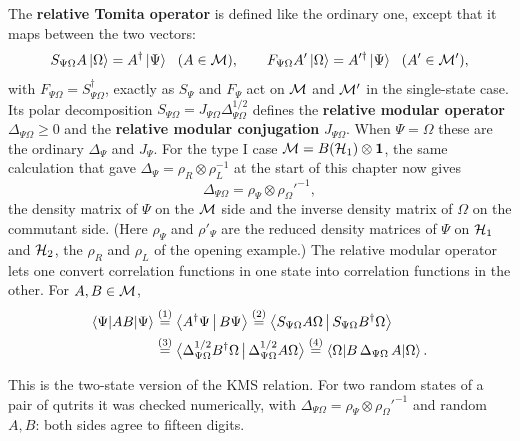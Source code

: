 The \textbf{relative Tomita operator} is defined like the ordinary one, except that it maps between the two
vectors:
\[
S_{\Psi\Omega}A\ket\Omega = A^\dagger\ket\Psi\ \ (A\in\M), \qquad
F_{\Psi\Omega}A'\ket\Omega = A'^\dagger\ket\Psi\ \ (A'\in\M') ,
\]
with $F_{\Psi\Omega}=S_{\Psi\Omega}^\dagger$, exactly as $S_\Psi$ and $F_\Psi$ act on $\mathcal{M}$ and $\mathcal{M}'$ in the
single-state case.
Its polar decomposition $S_{\Psi\Omega}=J_{\Psi\Omega}\Delta_{\Psi\Omega}^{1/2}$ defines the
\textbf{relative modular operator} $\Delta_{\Psi\Omega}\ge0$ and the \textbf{relative modular conjugation}
$J_{\Psi\Omega}$. When $\Psi=\Omega$ these are the ordinary $\Delta_\Psi$ and $J_\Psi$. For the type I case
$\mathcal{M}=B(\mathcal{H}_1)\otimes\mathbf{1}$, the same calculation that gave $\Delta_\Psi=\rho_R\otimes\rho_L^{-1}$ at the start of
this chapter now gives
\[
\Delta_{\Psi\Omega}=\rho_\Psi\otimes\rho_\Omega'^{-1} ,
\]
the density matrix of $\Psi$ on the $\mathcal{M}$ side and the inverse density matrix of $\Omega$ on the commutant
side. (Here $\rho_\Psi$ and $\rho'_\Psi$ are the reduced density matrices of $\Psi$ on $\mathcal{H}_1$ and $\mathcal{H}_2$,
the $\rho_R$ and $\rho_L$ of the opening example.) The relative modular operator lets one convert correlation functions in one state into correlation
functions in the other. For $A,B\in\mathcal{M}$,
\begin{align}
\braket{\Psi|AB|\Psi}
&\overset{(1)}{=} \big\langle A^\dagger\Psi\,\big|\,B\Psi\big\rangle
\overset{(2)}{=} \big\langle S_{\Psi\Omega}A\Omega\,\big|\,S_{\Psi\Omega}B^\dagger\Omega\big\rangle \notag\\
&\overset{(3)}{=} \big\langle \Delta_{\Psi\Omega}^{1/2}B^\dagger\Omega\,\big|\,\Delta_{\Psi\Omega}^{1/2}A\Omega\big\rangle
\overset{(4)}{=} \braket{\Omega|B\,\Delta_{\Psi\Omega}\,A|\Omega} .
\label{eq:twostate-kms}
\end{align}
\quad
{}\quad
{}\quad
{}

This is the two-state version of the KMS relation. For two random states of a pair of qutrits it was checked
numerically, with $\Delta_{\Psi\Omega}=\rho_\Psi\otimes\rho_\Omega'^{-1}$ and random $A,B$: both sides agree to
fifteen digits.

